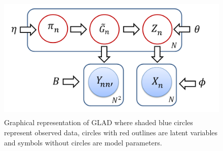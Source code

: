 % 
%
\begin{figure}[H]
\centering
\includegraphics[width=12cm, height= 6cm,trim=0cm 0.6cm 2.5cm 0cm]
{FIGURES/GLAD} 
\caption{Graphical representation of GLAD where shaded blue circles represent observed data, circles with red outlines are latent variables and symbols without circles are model parameters.}
\label{Fig:GLAD}
\end{figure}


